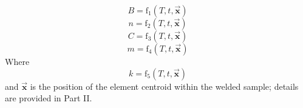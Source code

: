 \begin{equation}
\label{eq4}
B=\text{f}_1(T,t,\vec{\textbf{x}})
\end{equation}
\begin{equation}
\label{eq5}
n=\text{f}_2(T,t,\vec{\textbf{x}})
\end{equation}
\begin{equation}
\label{eq6}
C=\text{f}_3(T,t,\vec{\textbf{x}})
\end{equation}
\begin{equation}
\label{eq7}
m=\text{f}_4(T,t,\vec{\textbf{x}})
\end{equation}
Where
\begin{equation}
\label{eq3}
k=\text{f}_5(T,t,\vec{\textbf{x}})
\end{equation}
and $\vec{\textbf{x}}$ is the position of the element centroid within the welded sample; details are provided in Part II.

